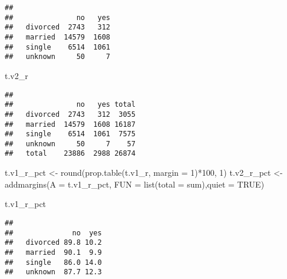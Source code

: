 \documentclass[
]{article}
\newenvironment{Shaded}{\begin{snugshade}}{\end{snugshade}}
\newcommand{\AttributeTok}[1]{\textcolor[rgb]{0.77,0.63,0.00}{#1}}
\newcommand{\ConstantTok}[1]{\textcolor[rgb]{0.00,0.00,0.00}{#1}}
\newcommand{\DecValTok}[1]{\textcolor[rgb]{0.00,0.00,0.81}{#1}}
\newcommand{\FunctionTok}[1]{\textcolor[rgb]{0.00,0.00,0.00}{#1}}
\newcommand{\NormalTok}[1]{#1}
\newcommand{\OtherTok}[1]{\textcolor[rgb]{0.56,0.35,0.01}{#1}}
\newcommand{\SpecialCharTok}[1]{\textcolor[rgb]{0.00,0.00,0.00}{#1}}
\begin{document}
\begin{verbatim}
##           
##               no   yes
##   divorced  2743   312
##   married  14579  1608
##   single    6514  1061
##   unknown     50     7
\end{verbatim}

\begin{Shaded}
\begin{Highlighting}[]
\NormalTok{t.v2\_r}
\end{Highlighting}
\end{Shaded}

\begin{verbatim}
##           
##               no   yes total
##   divorced  2743   312  3055
##   married  14579  1608 16187
##   single    6514  1061  7575
##   unknown     50     7    57
##   total    23886  2988 26874
\end{verbatim}

\begin{Shaded}
\begin{Highlighting}[]
\NormalTok{t.v1\_r\_pct }\OtherTok{\textless{}{-}} \FunctionTok{round}\NormalTok{(}\FunctionTok{prop.table}\NormalTok{(t.v1\_r, }\AttributeTok{margin =} \DecValTok{1}\NormalTok{)}\SpecialCharTok{*}\DecValTok{100}\NormalTok{, }\DecValTok{1}\NormalTok{)}
\NormalTok{t.v2\_r\_pct }\OtherTok{\textless{}{-}} \FunctionTok{addmargins}\NormalTok{(}\AttributeTok{A =}\NormalTok{ t.v1\_r\_pct, }\AttributeTok{FUN =} \FunctionTok{list}\NormalTok{(}\AttributeTok{total =}\NormalTok{ sum),}\AttributeTok{quiet =} \ConstantTok{TRUE}\NormalTok{)}

\NormalTok{t.v1\_r\_pct}
\end{Highlighting}
\end{Shaded}

\begin{verbatim}
##           
##              no  yes
##   divorced 89.8 10.2
##   married  90.1  9.9
##   single   86.0 14.0
##   unknown  87.7 12.3
\end{verbatim}
\end{document}
